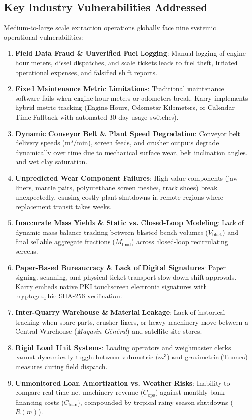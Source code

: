 \documentclass[11pt, a4paper]{article}
\begin{document}
\subsection{Key Industry Vulnerabilities Addressed}
Medium-to-large scale extraction operations globally face nine systemic operational vulnerabilities:
\begin{enumerate}
    \item \textbf{Field Data Fraud \& Unverified Fuel Logging}: Manual logging of engine hour meters, diesel dispatches, and scale tickets leads to fuel theft, inflated operational expenses, and falsified shift reports.
    \item \textbf{Fixed Maintenance Metric Limitations}: Traditional maintenance software fails when engine hour meters or odometers break. Karry implements hybrid metric tracking (Engine Hours, Odometer Kilometers, or Calendar Time Fallback with automated 30-day usage switches).
    \item \textbf{Dynamic Conveyor Belt \& Plant Speed Degradation}: Conveyor belt delivery speeds ($\text{m}^3/\text{min}$), screen feeds, and crusher outputs degrade dynamically over time due to mechanical surface wear, belt inclination angles, and wet clay saturation.
    \item \textbf{Unpredicted Wear Component Failures}: High-value components (jaw liners, mantle pairs, polyurethane screen meshes, track shoes) break unexpectedly, causing costly plant shutdowns in remote regions where replacement transit takes weeks.
    \item \textbf{Inaccurate Mass Yields \& Static vs. Closed-Loop Modeling}: Lack of dynamic mass-balance tracking between blasted bench volumes ($V_{\text{blast}}$) and final sellable aggregate fractions ($M_{\text{final}}$) across closed-loop recirculating screens.
    \item \textbf{Paper-Based Bureaucracy \& Lack of Digital Signatures}: Paper signing, scanning, and physical ticket transport slow down shift approvals. Karry embeds native PKI touchscreen electronic signatures with cryptographic SHA-256 verification.
    \item \textbf{Inter-Quarry Warehouse \& Material Leakage}: Lack of historical tracking when spare parts, crusher liners, or heavy machinery move between a Central Warehouse (\textit{Magasin G\'en\'eral}) and satellite site stores.
    \item \textbf{Rigid Load Unit Systems}: Loading operators and weighmaster clerks cannot dynamically toggle between volumetric ($m^3$) and gravimetric ($\text{Tonnes}$) measures during field dispatch.
    \item \textbf{Unmonitored Loan Amortization vs. Weather Risks}: Inability to compare real-time net machinery revenue ($C_{\text{ops}}$) against monthly bank financing costs ($C_{\text{loan}}$), compounded by tropical rainy season shutdowns ($R(m)$).
\end{enumerate}
\end{document}
